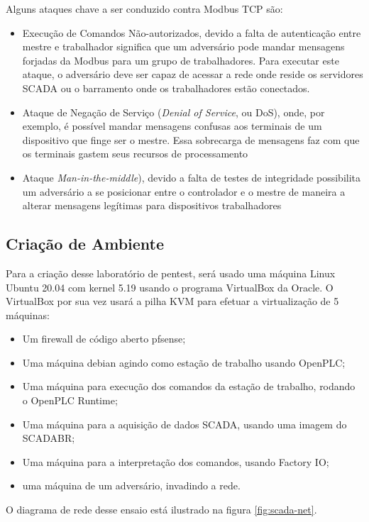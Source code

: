 \documentclass[tcc,capa]{texufpel}
\begin{document}
Alguns ataques chave a ser conduzido contra Modbus TCP são:
\begin{itemize}
        \item Execução de Comandos Não-autorizados, devido a falta de autenticação entre mestre e trabalhador significa que um adversário pode mandar mensagens forjadas da Modbus para um grupo de trabalhadores. Para executar este ataque, o adversário deve ser capaz de acessar a rede onde reside os servidores SCADA ou o barramento onde os trabalhadores estão conectados.
        \item Ataque de Negação de Serviço (\textit{Denial of Service}, ou DoS), onde, por exemplo, é possível mandar mensagens confusas aos terminais de um dispositivo que finge ser o mestre. Essa sobrecarga de mensagens faz com que os terminais gastem seus recursos de processamento
        \item Ataque \textit{Man-in-the-middle}), devido a falta de testes de integridade possibilita um adversário a se posicionar entre o controlador e o mestre de maneira a alterar mensagens legítimas para dispositivos trabalhadores
\end{itemize}

\subsection{Criação de Ambiente}

Para a criação desse laboratório de pentest, será usado uma máquina Linux Ubuntu 20.04 com kernel 5.19 usando o programa VirtualBox da Oracle. O VirtualBox por sua vez usará a
pilha KVM para efetuar a virtualização de 5 máquinas:

\begin{itemize}
        \item Um firewall de código aberto pfsense;
        \item Uma máquina debian agindo como estação de trabalho usando OpenPLC;
        \item Uma máquina para execução dos comandos da estação de trabalho, rodando o OpenPLC Runtime;
        \item Uma máquina para a aquisição de dados SCADA, usando uma imagem do SCADABR;
        \item Uma máquina para a interpretação dos comandos, usando Factory IO;
        \item uma máquina de um adversário, invadindo a rede.
\end{itemize}

O diagrama de rede desse ensaio está ilustrado na figura \ref{fig:scada-net}.
\end{document}
